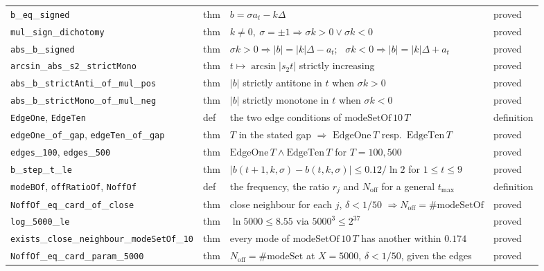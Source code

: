 \documentclass[11pt,a4paper]{article}
\newcommand{\lb}{\_\allowbreak}
\theoremstyle{definition}
\theoremstyle{remark}
\begin{document}
\begin{longtable}{@{}p{3.75cm}p{1.52cm}p{8.38cm}p{1.45cm}@{}}
\texttt{b}\lb\texttt{eq}\lb\texttt{signed} & thm & $b=\sigma a_t-k\Delta$ & proved\\
\texttt{mul}\lb\texttt{sign}\lb\texttt{dichotomy} & thm & $k\ne0,\ \sigma=\pm1\Rightarrow\sigma k>0\vee\sigma k<0$ & proved\\
\texttt{abs}\lb\texttt{b}\lb\texttt{signed} & thm & $\sigma k>0\Rightarrow|b|=|k|\Delta-a_t$; \ $\sigma k<0\Rightarrow|b|=|k|\Delta+a_t$ & proved\\
\texttt{arcsin}\lb\texttt{abs}\lb\texttt{s2}\lb\texttt{strictMono} & thm & $t\mapsto\arcsin|s_2 t|$ strictly increasing & proved\\
\texttt{abs}\lb\texttt{b}\lb\texttt{strictAnti}\lb\texttt{of}\lb\texttt{mul}\lb\texttt{pos} & thm & $|b|$ strictly antitone in $t$ when $\sigma k>0$ & proved\\
\texttt{abs}\lb\texttt{b}\lb\texttt{strictMono}\lb\texttt{of}\lb\texttt{mul}\lb\texttt{neg} & thm & $|b|$ strictly monotone in $t$ when $\sigma k<0$ & proved\\
\texttt{EdgeOne}, \texttt{EdgeTen} & def & the two edge conditions of $\mathrm{modeSetOf}\,10\,T$ & definition\\
\texttt{edgeOne}\lb\texttt{of}\lb\texttt{gap}, \texttt{edgeTen}\lb\texttt{of}\lb\texttt{gap} & thm & $T$ in the stated gap $\Rightarrow$ $\mathrm{EdgeOne}\,T$ resp.\ $\mathrm{EdgeTen}\,T$ & proved\\
\texttt{edges}\lb\texttt{100}, \texttt{edges}\lb\texttt{500} & thm & $\mathrm{EdgeOne}\,T\wedge\mathrm{EdgeTen}\,T$ for $T=100,500$ & proved\\
\texttt{b}\lb\texttt{step}\lb\texttt{t}\lb\texttt{le} & thm & $|b(t{+}1,k,\sigma)-b(t,k,\sigma)|\le0.12/\ln2$ for $1\le t\le9$ & proved\\
\texttt{modeBOf}, \texttt{offRatioOf}, \texttt{NoffOf} & def & the frequency, the ratio $r_j$ and $N_{\mathrm{off}}$ for a general $t_{\max}$ & definition\\
\texttt{NoffOf}\lb\texttt{eq}\lb\texttt{card}\lb\texttt{of}\lb\texttt{close} & thm & close neighbour for each $j$, $\delta<1/50$ $\Rightarrow N_{\mathrm{off}}=\#\mathrm{modeSetOf}$ & proved\\
\texttt{log}\lb\texttt{5000}\lb\texttt{le} & thm & $\ln 5000\le8.55$ via $5000^3\le2^{37}$ & proved\\
\texttt{exists}\lb\texttt{close}\lb\texttt{neighbour}\lb\texttt{modeSetOf}\lb\texttt{10} & thm & every mode of $\mathrm{modeSetOf}\,10\,T$ has another within $0.174$ & proved\\
\texttt{NoffOf}\lb\texttt{eq}\lb\texttt{card}\lb\texttt{param}\lb\texttt{5000} & thm & $N_{\mathrm{off}}=\#\mathrm{modeSet}$ at $X=5000$, $\delta<1/50$, given the edges & proved\\

\end{longtable}
\end{document}

